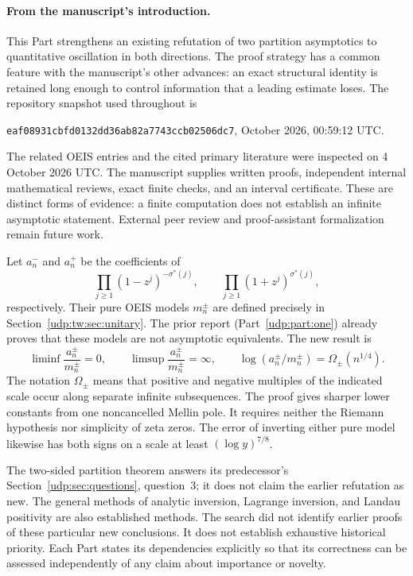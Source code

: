 \documentclass[11pt]{article}
\theoremstyle{remark}\newtheorem{remark}[theorem]{Remark}
\numberwithin{equation}{section}
\begin{document}
\paragraph{From the manuscript's introduction.}
This Part strengthens
an existing refutation of two partition asymptotics to quantitative
oscillation in both directions. The proof strategy
has a common feature with the manuscript's other advances: an exact structural identity is retained long enough
to control information that a leading estimate loses.
The repository snapshot used throughout is
\begin{center}\small
 \texttt{eaf08931cbfd0132dd36ab82a7743ccb02506dc7},
  October 2026, 00:59:12 UTC.
\end{center}
The related OEIS entries and the cited primary literature were inspected
on 4 October 2026 UTC. The manuscript supplies written proofs, independent
internal mathematical reviews, exact finite checks, and an interval
certificate. These are distinct forms of evidence: a finite computation
does not establish an infinite asymptotic statement. External peer review
and proof-assistant formalization remain future work.

Let $a_n^-$ and $a_n^+$ be the coefficients of
\[
 \prod_{j\ge1}(1-z^j)^{-\sigma^*(j)},\qquad
 \prod_{j\ge1}(1+z^j)^{\sigma^*(j)},
\]
respectively. Their pure OEIS models $m_n^\pm$ are defined precisely in
Section~\ref{udp:tw:sec:unitary}. The prior report (Part~\ref{udp:part:one}) already proves that these
models are not asymptotic equivalents. The new result is
\[
 \liminf\frac{a_n^\pm}{m_n^\pm}=0,
 \qquad \limsup\frac{a_n^\pm}{m_n^\pm}=\infty,
 \qquad
 \log(a_n^\pm/m_n^\pm)=\Omega_\pm(n^{1/4}).
\]
The notation $\Omega_\pm$ means that positive and negative multiples of
the indicated scale occur along separate infinite subsequences.
The proof gives sharper lower constants from one noncancelled Mellin pole.
It requires neither the Riemann hypothesis nor simplicity of zeta zeros.
The error of inverting either pure model likewise has both signs on a
scale at least $(\log y)^{7/8}$.

The two-sided partition theorem answers its predecessor's
Section~\ref{udp:sec:questions}, question~3; it does not claim the earlier refutation as new.
The general methods of analytic inversion, Lagrange inversion, and
Landau positivity are also established methods.
The search did not identify earlier proofs of these particular new
conclusions. It does not establish exhaustive historical priority.
Each Part states its dependencies explicitly so that its correctness can
be assessed independently of any claim about importance or novelty.
\end{document}
